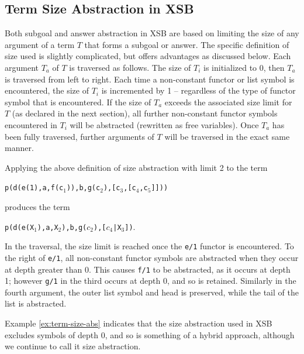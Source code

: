 \subsection{Term Size Abstraction in XSB} \label{sec:size-metric}
%
Both subgoal and answer abstraction in XSB are based on limiting the
size of any argument of a term $T$ that forms a subgoal or answer.
The specific definition of size used is slightly complicated, but
offers advantages as discussed below.  Each argument $T_a$ of $T$ is
traversed as follows.  The size of $T_i$ is initialized to 0, then
$T_a$ is traversed from left to right.  Each time a non-constant
functor or list symbol is encountered, the size of $T_i$ is
incremented by 1 -- regardless of the type of functor symbol that is
encountered.  If the size of $T_a$ exceeds the associated size limit
for $T$ (as declared in the next section), all further non-constant
functor symbols encountered in $T_i$ will be abstracted (rewritten as
free variables).  Once $T_a$ has been fully traversed, further
arguments of $T$ will be traversed in the exact same manner.


\begin{example} \label{ex:term-size-abs}
Applying the above definition of size abstraction with limit 2 to the
term 

{\tt p(d(e(1),a,f(c$_1$)),b,g(c$_2$),[c$_3$,[c$_4$,c$_5$]]))}

\noindent
  produces the term 

{\tt p(d(e(X$_1$),a,X$_2$),b,g($c_2$),[$c_4$|X$_3$])}.  

\noindent
In the traversal, the size limit is reached once the {\tt e/1} functor
is encountered.  To the right of {\tt e/1}, all non-constant functor
symbols are abstracted when they occur at depth greater than 0.  This
causes {\tt f/1} to be abstracted, as it occurs at depth 1; however
{\tt g/1} in the third occurs at depth 0, and so is retained.
Similarly in the fourth argument, the outer list symbol and head is
preserved, while the tail of the list is abstracted.
\end{example}

Example \ref{ex:term-size-abs} indicates that the size abstraction
used in XSB excludes symbols of depth 0, and so is something of a
hybrid approach, although we continue to call it size abstraction.

